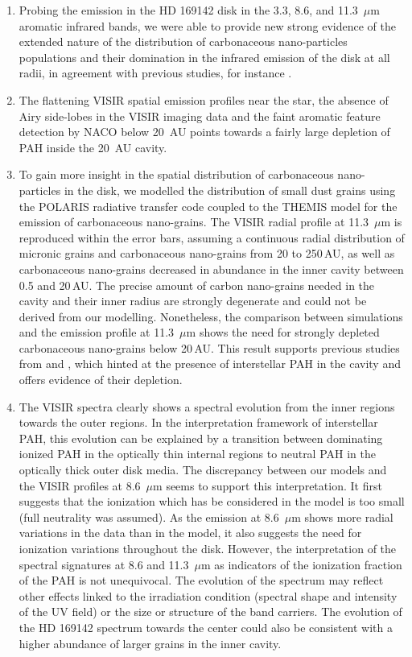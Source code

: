 \documentclass{aa}
\newcommand{\mic}{~$\mu$m\xspace}
\begin{document}
\begin{enumerate}
    
\item Probing the emission in the HD 169142 disk in the 3.3, 8.6, and 11.3\mic aromatic infrared bands, we were able to provide new strong evidence of the extended nature of the distribution of carbonaceous nano-particles populations and their domination in the infrared emission of the disk at all radii, in agreement with previous studies, for instance \citet{Seok_2016}. 
    
\item The flattening VISIR spatial emission profiles near the star, the absence of Airy side-lobes in the VISIR imaging data and the faint aromatic feature detection by NACO below 20~AU points towards a fairly large depletion of PAH inside the 20~AU cavity. 

\item To gain more insight in the spatial distribution of carbonaceous nano-particles in the disk, we modelled the distribution of small dust grains using the POLARIS radiative transfer code coupled to the  THEMIS model for the emission of carbonaceous nano-grains.
The VISIR radial profile at 11.3\mic  is reproduced within the error bars, assuming a continuous radial distribution of micronic grains and carbonaceous nano-grains from 20 to 250\,AU, as well as carbonaceous nano-grains decreased in abundance in the inner cavity between 0.5 and 20\,AU. The precise amount of carbon nano-grains needed in the cavity and their inner radius are strongly degenerate and could not be derived from our modelling. Nonetheless, the comparison between simulations and the emission profile at 11.3\mic shows the need for strongly depleted carbonaceous nano-grains below 20\,AU. This result supports previous studies from \cite{Maaskant2013} and \citet{Seok_2016}, which hinted at the presence of interstellar PAH in the cavity and offers evidence of their depletion.

\item The VISIR spectra clearly shows a spectral evolution from the inner regions towards the outer regions. In the interpretation framework of interstellar PAH, this evolution can be explained by a transition between dominating ionized PAH in the optically thin internal regions to neutral PAH in the optically thick outer disk media.
The discrepancy between our models and the VISIR profiles at 8.6\mic seems to support this interpretation. It first suggests that the ionization which has be considered in the model is too small (full neutrality was assumed). As the emission at 8.6\mic shows more radial variations in the data than in the model, it also suggests the need for ionization variations throughout the disk. However, the interpretation of the spectral signatures at 8.6 and 11.3\mic as indicators of the ionization fraction of the PAH is not unequivocal. The evolution of the spectrum may reflect other effects linked to the irradiation condition (spectral shape and intensity of the UV field) or the size or structure of the band carriers. The evolution of the HD 169142 spectrum towards the center could also be consistent with a higher abundance of larger grains in the inner cavity. 


\end{enumerate}
\end{document}
